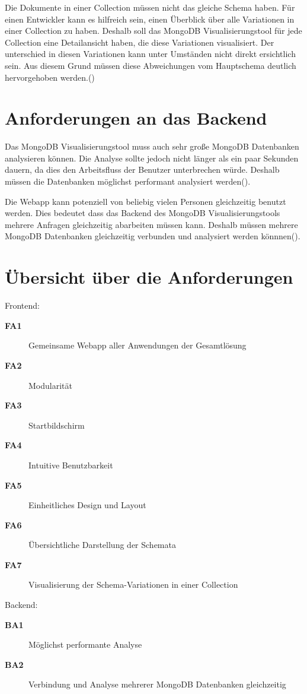Die Dokumente in einer Collection müssen nicht das gleiche Schema haben.
Für einen Entwickler kann es hilfreich sein, einen Überblick über alle Variationen in einer Collection zu haben.
Deshalb soll das MongoDB Visualisierungstool für jede Collection eine Detailansicht haben, die diese Variationen visualisiert.
Der unterschied in diesen Variationen kann unter Umständen nicht direkt ersichtlich sein.
Aus diesem Grund müssen diese Abweichungen vom Hauptschema deutlich hervorgehoben werden.()

\section{Anforderungen an das Backend}
\label{sec:anf_backend}

Das MongoDB Visualisierungstool muss auch sehr große MongoDB Datenbanken analysieren können.
Die Analyse sollte jedoch nicht länger als ein paar Sekunden dauern, da dies den Arbeitsfluss der Benutzer unterbrechen würde.
Deshalb müssen die Datenbanken möglichst performant analysiert werden().

Die Webapp kann potenziell von beliebig vielen Personen gleichzeitig benutzt werden.
Dies bedeutet dass das Backend des MongoDB Visualisierungstools mehrere Anfragen gleichzeitig abarbeiten müssen kann.
Deshalb müssen mehrere MongoDB Datenbanken gleichzeitig verbunden und analysiert werden könnnen().


\section{Übersicht über die Anforderungen}
\label{sec:anf_uebersicht}

Frontend:

\begin{description}
    \item[\textbf{FA1}\label{itm:fa1}] Gemeinsame Webapp aller Anwendungen der Gesamtlösung
    \item[\textbf{FA2}\label{itm:fa2}] Modularität
    \item[\textbf{FA3}\label{itm:fa3}] Startbildschirm
    \item[\textbf{FA4}\label{itm:fa4}] Intuitive Benutzbarkeit
    \item[\textbf{FA5}\label{itm:fa5}] Einheitliches Design und Layout
    \item[\textbf{FA6}\label{itm:fa6}] Übersichtliche Darstellung der Schemata
    \item[\textbf{FA7}\label{itm:fa7}] Visualisierung der Schema-Variationen in einer Collection
\end{description}

Backend:

\begin{description}
    \item[\textbf{BA1}\label{itm:ba1}] Möglichst performante Analyse
    \item[\textbf{BA2}\label{itm:ba2}] Verbindung und Analyse mehrerer MongoDB Datenbanken gleichzeitig
\end{description}

